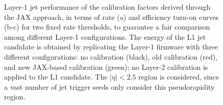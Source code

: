 \begin{figure}
    \centering
    
    \caption{Layer-1 jet performance of the calibration factors derived through the JAX approach, in terms of rate (a) and efficiency turn-on curves (b-c) for two fixed rate thresholds, to guarantee a fair comparison among different Layer-1 configurations. The energy of the L1 jet candidate is obtained by replicating the Layer-1 firmware with three different configurations: no calibration (black), old calibration (red), and new JAX-based calibration (green); no Layer-2 calibration is applied to the L1 candidate. The $|\eta|<2.5$ region is considered, since a vast number of jet trigger seeds only consider this pseudorapidity region.}
    \label{fig:JAX_HCAL_TurnOn_Er2p5}
\end{figure}

